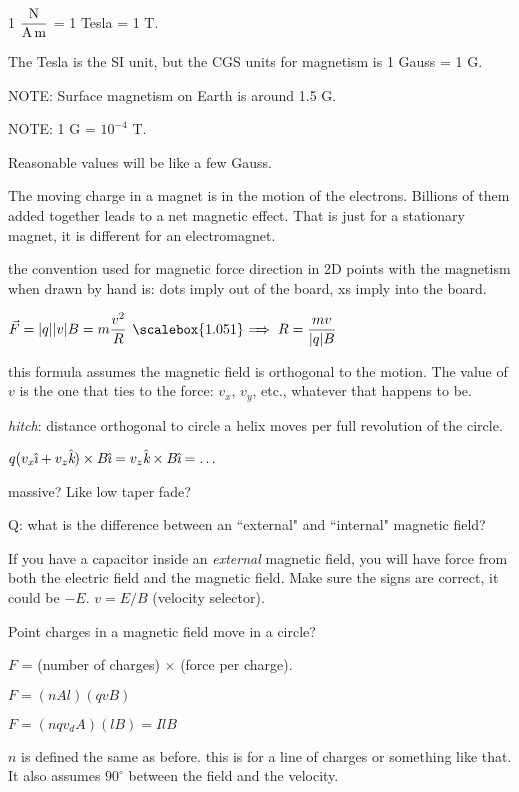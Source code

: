 \documentclass[12pt]{article}
\newcommand \hpx [1]{\hspace{#1px}}
\newcommand \nhpx [1]{\hspace{-#1px}}
\renewcommand \implies {\hpx 4 \raisebox{-0.14px}{\scalebox{1.051} =} \nhpx{5.2} \Rightarrow \hpx 3}
\newcommand \ihat {\hat{\nhpx 1 \textit\i}}
\newcommand \khat {\hat{\textit k}}
\begin{document}
1 $\dfrac {\rm N}{\rm A \, m}$ = 1 Tesla = 1 T.

The Tesla is the SI unit, but the CGS units for magnetism is 1 Gauss = 1 G.

NOTE: Surface magnetism on Earth is around 1.5 G.

NOTE: 1 G = $10^{-4}$ T.

Reasonable values will be like a few Gauss.

The moving charge in a magnet is in the motion of the electrons.
Billions of them added together leads to a net magnetic effect.
That is just for a stationary magnet, it is different for an electromagnet.

the convention used for magnetic force direction in 2D points with the magnetism
when drawn by hand is: dots imply out of the board, xs imply into the board.

$\vec F = |q| |v| B = m \dfrac{v^2} R \implies R = \dfrac{m v}{|q| B}$


this formula assumes the magnetic field is orthogonal to the motion. The value of $v$
is the one that ties to the force: $v_x$, $v_y$, etc., whatever that happens to be.

\emph{hitch}: distance orthogonal to circle a helix moves per full revolution of the circle.

$q (v_x \ihat + v_z \khat) \times B \ihat = v_z \khat \times B \ihat = \ldots$

massive? Like low taper fade?

Q: what is the difference between an ``external" and ``internal" magnetic field?

If you have a capacitor inside an \emph{external} magnetic field, you will have force from both
the electric field and the magnetic field. Make sure the signs are correct, it could be $-E$.
$v = E/B$ (velocity selector).

Point charges in a magnetic field move in a circle?

$F$ = (number of charges) $\times$ (force per charge).

$F = (n A l) (q v B)$

$F = (n q v_d A) (l B) = I l B$

$n$ is defined the same as before. this is for a line of charges or something like that.
It also assumes $90^\circ$ between the field and the velocity.
\end{document}
